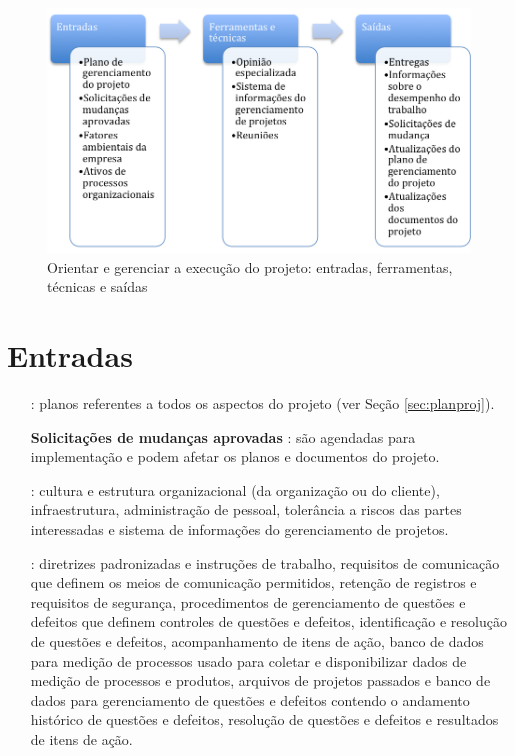 \begin{figure}[!h]
	\centering
	\includegraphics[scale=0.75]{Figuras/ori_ger_exec_proj_efts.png}
	\caption{Orientar e gerenciar a execução do projeto: entradas, ferramentas, técnicas e saídas}
	\label{fig:ori:ger:exe:projeto:etfs}
\end{figure}

\section{Entradas}

\begin{itemize}
	
	\item[\textbf{\planproj}]: planos referentes a todos os aspectos do projeto (ver Seção \ref{sec:planproj}).
	
	\item[\textbf{Solicitações de mudanças aprovadas}]: são agendadas para implementação e podem afetar os planos e documentos do projeto.
	
	\item[\textbf{\amb}]: cultura e estrutura organizacional (da organização ou do cliente), infraestrutura, administração de pessoal, tolerância a riscos das partes interessadas e sistema de informações do gerenciamento de projetos. 
	
	\item[\textbf{\ativ}]: diretrizes padronizadas e instruções de trabalho, requisitos de comunicação que definem os meios de comunicação permitidos, retenção de registros e requisitos de segurança, procedimentos de gerenciamento de questões e defeitos que definem controles de questões e defeitos, identificação e resolução de questões e defeitos, acompanhamento de itens de ação, banco de dados para medição de processos usado para coletar e disponibilizar dados de medição de processos e produtos, arquivos de projetos passados e banco de dados para gerenciamento de questões e defeitos contendo o andamento histórico de questões e defeitos, resolução de questões e defeitos e resultados de itens de ação.
	
\end{itemize}

